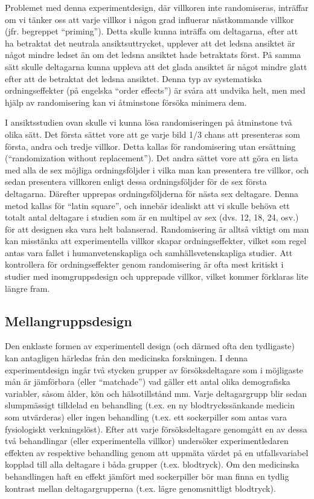 \documentclass[
]{book}
\begin{document}
Problemet med denna experimentdesign, där villkoren inte randomiseras, inträffar om vi tänker oss att varje villkor i någon grad influerar nästkommande villkor (jfr. begreppet ``priming''). Detta skulle kunna inträffa om deltagarna, efter att ha betraktat det neutrala ansiktsuttrycket, upplever att det ledsna ansiktet är något mindre ledset än om det ledsna ansiktet hade betraktats först. På samma sätt skulle deltagarna kunna uppleva att det glada ansiktet är något mindre glatt efter att de betraktat det ledsna ansiktet. Denna typ av systematiska ordningseffekter (på engelska ``order effects'') är svåra att undvika helt, men med hjälp av randomisering kan vi åtminstone försöka minimera dem.

I ansiktsstudien ovan skulle vi kunna lösa randomiseringen på åtminstone två olika sätt. Det första sättet vore att ge varje bild 1/3 chans att presenteras som första, andra och tredje villkor. Detta kallas för randomisering utan ersättning (``randomization without replacement''). Det andra sättet vore att göra en lista med alla de sex möjliga ordningsföljder i vilka man kan presentera tre villkor, och sedan presentera villkoren enligt dessa ordningsföljder för de sex första deltagarna. Därefter upprepas ordningsföljderna för nästa sex deltagare. Denna metod kallas för ``latin square'', och innebär idealiskt att vi skulle behöva ett totalt antal deltagare i studien som är en multipel av sex (dvs. 12, 18, 24, osv.) för att designen ska vara helt balanserad. Randomisering är alltså viktigt om man kan misstänka att experimentella villkor skapar ordningseffekter, vilket som regel antas vara fallet i humanvetenskapliga och samhällsvetenskapliga studier. Att kontrollera för ordningseffekter genom randomisering är ofta mest kritiskt i studier med inomgruppsdesign och upprepade villkor, vilket kommer förklaras lite längre fram.

\hypertarget{sub07.5.3}{%
\subsection{Mellangruppsdesign}\label{sub07.5.3}}

Den enklaste formen av experimentell design (och därmed ofta den tydligaste) kan antagligen härledas från den medicinska forskningen. I denna experimentdesign ingår två stycken grupper av försöksdeltagare som i möjligaste mån är jämförbara (eller ``matchade'') vad gäller ett antal olika demografiska variabler, såsom ålder, kön och hälsotillstånd mm. Varje deltagargrupp blir sedan slumpmässigt tilldelad en behandling (t.ex. en ny blodtryckssänkande medicin som utvärderas) eller ingen behandling (t.ex. ett sockerpiller som antas vara fysiologiskt verkningslöst). Efter att varje försöksdeltagare genomgått en av dessa två behandlingar (eller experimentella villkor) undersöker experimentledaren effekten av respektive behandling genom att uppmäta värdet på en utfallsvariabel kopplad till alla deltagare i båda grupper (t.ex. blodtryck). Om den medicinska behandlingen haft en effekt jämfört med sockerpiller bör man finna en tydlig kontrast mellan deltagargrupperna (t.ex. lägre genomsnittligt blodtryck).
\end{document}
